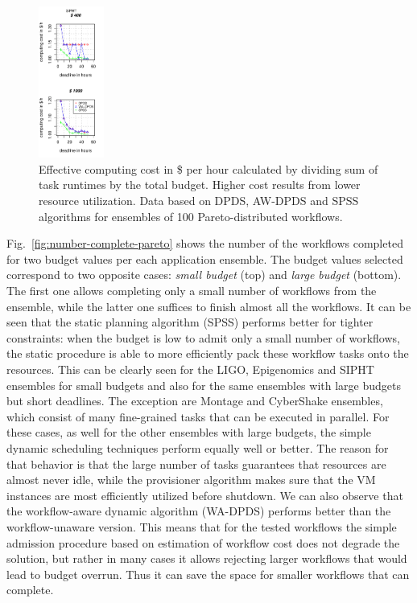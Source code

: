 \documentclass{sig-alternate}
\begin{document}
\begin{figure}[htb]
\includegraphics[width=0.19\textwidth]{figures/pareto-cost-SIPHT-n-1000-8-dagh5-50m0.pdf}
\caption{Effective computing cost in \$ per hour calculated by dividing sum of
task runtimes by the total budget. Higher cost results from lower resource utilization. Data based on DPDS, AW-DPDS and SPSS algorithms for ensembles of 100
Pareto-distributed workflows.}
\label{fig:cost}
\end{figure}



Fig.~\ref{fig:number-complete-pareto} shows the number of the workflows
completed for two budget values per each application ensemble. The budget values
selected correspond to two opposite cases: {\em small budget} (top) and {\em
large budget} (bottom). The first one allows completing only a small number of
workflows from the ensemble, while the latter one suffices to finish almost all
the workflows. It can be seen that the static planning algorithm (SPSS) performs
better for tighter constraints: when the budget is low to admit only a small
number of workflows, the static procedure is able to more efficiently pack these
workflow tasks onto the resources. This can be clearly seen for the LIGO,
Epigenomics and SIPHT ensembles for small budgets and also for the same
ensembles with large budgets but short deadlines. The exception are Montage and
CyberShake ensembles, which consist of many fine-grained tasks that can be
executed in parallel. For these cases, as well for the other ensembles with
large budgets, the simple dynamic scheduling techniques perform equally well or
better. The reason for that behavior is that the large number of tasks
guarantees that resources are almost never idle, while the provisioner algorithm
makes sure that the VM instances are most efficiently utilized before shutdown.
We can also observe that the workflow-aware dynamic algorithm (WA-DPDS) performs
better than the workflow-unaware version. This means that for the tested
workflows the simple admission procedure based on estimation of workflow cost
does not degrade the solution, but rather in many cases it allows rejecting
larger workflows that would lead to budget overrun. Thus it can save the space
for smaller workflows that can complete.
\end{document}

